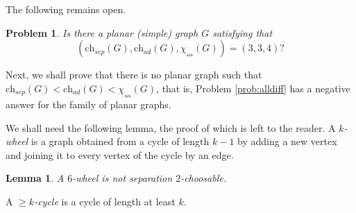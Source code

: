 \documentclass[12pt]{article}
\newtheorem{problem}[theorem]{Problem}
\newtheorem{lemma}[theorem]{Lemma}
\newcommand{\single}{\chi_{\nleftrightarrow}}
\newcommand{\ch}{\mathrm{ch}}
\newcommand{\chsep}{\mathrm{ch}_{sep}}
\newcommand{\chad}{\mathrm{ch}_{ad}}
\newcommand{\sing}{\chi_{\nleftrightarrow}}
\begin{document}
The following remains open.

\begin{problem}
    Is there a planar (simple) graph $G$ satisfying that 
    $$
    (\chsep(G), \chad(G), \sing(G))=(3,3,4)?
    $$
\end{problem}




Next, we shall prove that there is no planar graph such that
$\ch_{sep}(G) < \ch_{ad}(G) < \single(G)$, that is, Problem
\ref{prob:alldiff} has a negative answer for the family of 
planar graphs.


We shall need the following lemma, the proof of which
is left to the reader. A {\em $k$-wheel} is a graph
obtained from a cycle of length $k-1$ by adding a new vertex and
joining it to every vertex of the cycle by an edge.

\begin{lemma}
    \label{lem:wheel}
    A $6$-wheel is not separation $2$-choosable.
\end{lemma}


A {\em $\geq k$-cycle} is a cycle of length at least $k$.
\end{document}
